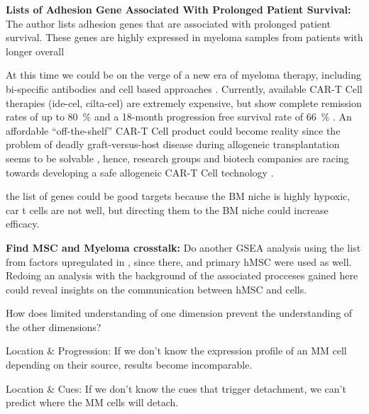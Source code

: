 



\textbf{Lists of Adhesion Gene Associated With Prolonged Patient Survival:}
The author lists adhesion genes that are associated with prolonged patient
survival. These genes are highly expressed in myeloma samples from patients with
longer overall

At this time we could be on the verge of a new era of myeloma therapy,
including bi-specific antibodies and cell based approaches
\cite{moreNovelImmunotherapiesCombinations2023,
      engelhardtFunctionalCureLongterm2024}. Currently, available CAR-T Cell therapies
(ide-cel, cilta-cel) are extremely expensive, but show complete remission rates
of up to \SI{80}{\percent} and a 18-month progression free survival rate of
\SI{66}{\percent} \cite{bobinRecentAdvancesTreatment2022}. An affordable
``off-the-shelf'' CAR-T Cell product could become reality since the problem of
deadly graft-versus-host disease during allogeneic transplantation seems to be
solvable \cite{qasimMolecularRemissionInfant2017}, hence, research groups and
biotech companies are racing towards developing a safe allogeneic CAR-T Cell
technology \cite{depilOfftheshelfAllogeneicCAR2020}.


the list of genes could be good targets because the BM niche is highly hypoxic,
car t cells are not well, but directing them to the BM niche could increase
efficacy.


\textbf{Find MSC and Myeloma crosstalk:}
Do another GSEA analysis using the list from factors upregulated in
\citet{dotterweichContactMyelomaCells2016}, since there, \INA and primary
\ac{hMSC} were used as well. Redoing an analysis with the background of the
associated procceses gained here could reveal insights on the communication
between \ac{hMSC} and \INA cells.



%
\label{sec:discussion_conclusion_cancer}%



How does limited understanding of one dimension prevent the understanding of the
other dimensions?

Location \& Progression: If we don't know the expression profile of an MM cell depending on their
source, results become incomparable.

Location \& Cues: If we don't know the cues that trigger detachment, we can't
predict where the MM cells will detach.



